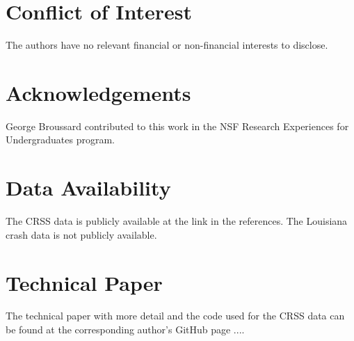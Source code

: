 \documentclass[fleqn]{cas-sc}
\begin{document}
\section*{Conflict of Interest}

The authors have no relevant financial or non-financial interests to disclose.

\section*{Acknowledgements}

George Broussard contributed to this work in the NSF Research Experiences for Undergraduates program.

\section*{Data Availability}

The CRSS data is publicly available at the link in the references.  The Louisiana crash data is not publicly available.  

\section*{Technical Paper}

The technical paper with more detail and the code used for the CRSS data can be found at the corresponding author's GitHub page ....



\begin{comment}
\begin{figure}[<options>]
	\centering
		\texttt{[image: ]}
	  \caption{}\label{fig1}
\end{figure}


\begin{table}[<options>]
\caption{}\label{tbl1}
\begin{tabular*}{\tblwidth}{@{}LL@{}}
\toprule
  &  \\ %
\midrule
 & \\
 & \\
 & \\
 & \\
\bottomrule
\end{tabular*}
\end{table}
\end{comment}
\end{document}
